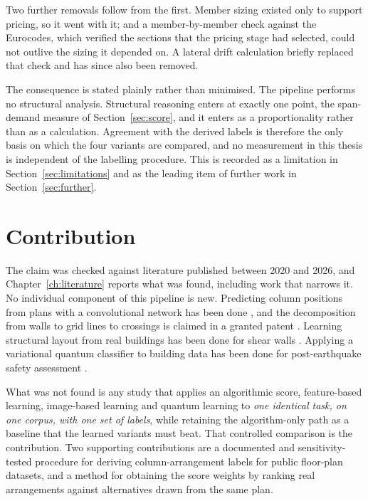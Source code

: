 Two further removals follow from the first. Member sizing existed only to
support pricing, so it went with it; and a member-by-member check against
the Eurocodes, which verified the sections that the pricing stage had
selected, could not outlive the sizing it depended on. A lateral drift
calculation briefly replaced that check and has since also been removed.

The consequence is stated plainly rather than minimised. The pipeline
performs no structural analysis. Structural reasoning enters at exactly
one point, the span-demand measure of
Section~\ref{sec:score}, and it enters as a proportionality rather than as
a calculation. Agreement with the derived labels is therefore the only
basis on which the four variants are compared, and no measurement in this
thesis is independent of the labelling procedure. This is recorded as a
limitation in Section~\ref{sec:limitations} and as the leading item of
further work in Section~\ref{sec:further}.

\section{Contribution}
\label{sec:contribution}

The claim was checked against literature published between 2020 and 2026,
and Chapter~\ref{ch:literature} reports what was found, including work
that narrows it. No individual component of this pipeline is new.
Predicting column positions from plans with a convolutional network has
been done \citep{ampanavos2021approxiframer}, and the decomposition from
walls to grid lines to crossings is claimed in a granted patent
\citep{wang2024columnrl}. Learning structural layout from real buildings
has been done for shear walls \citep{liao2021shearwallgan,pizarro2021walls}.
Applying a variational quantum classifier to building data has been done
for post-earthquake safety assessment \citep{bhatta2024quantum}.

What was not found is any study that applies an algorithmic score,
feature-based learning, image-based learning and quantum learning to
\emph{one identical task, on one corpus, with one set of labels}, while
retaining the algorithm-only path as a baseline that the learned variants
must beat. That controlled comparison is the contribution. Two supporting
contributions are a documented and sensitivity-tested procedure for
deriving column-arrangement labels for public floor-plan datasets, and a
method for obtaining the score weights by ranking real arrangements
against alternatives drawn from the same plan.

